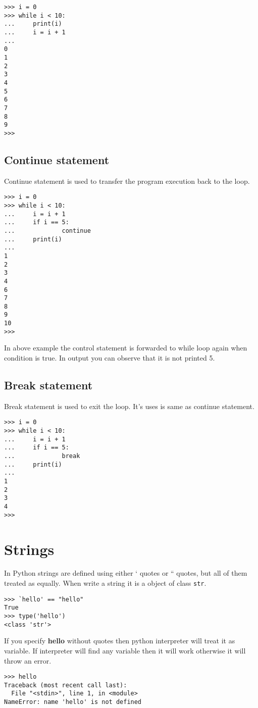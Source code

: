 \documentclass[letterpaper,12pt]{book}
\begin{document}
\begin{lstlisting}
>>> i = 0
>>> while i < 10:
...     print(i)
...     i = i + 1
... 
0
1
2
3
4
5
6
7
8
9
>>> 
\end{lstlisting}

\subsection{Continue statement}
Continue statement is used to transfer the program execution back to the loop.

\begin{lstlisting}
>>> i = 0
>>> while i < 10:
...     i = i + 1
...     if i == 5:
...             continue
...     print(i)
... 
1
2
3
4
6
7
8
9
10
>>> 
\end{lstlisting}
In above example the control statement is forwarded to while loop again when condition is true. In output you can observe that it is not printed 5.

\subsection{Break statement}
Break statement is used to exit the loop. It's uses is same as continue statement.
\begin{lstlisting}
>>> i = 0
>>> while i < 10:
...     i = i + 1
...     if i == 5:
...             break
...     print(i)
... 
1
2
3
4
>>> 
\end{lstlisting}

\section{Strings}
In Python strings are defined using either ` quotes or `` quotes, but all of them treated as equally. When write a string it is a object of class \texttt{str}. 
\begin{lstlisting}
>>> `hello' == "hello"
True
>>> type('hello')
<class 'str'>
\end{lstlisting}
If you specify \textbf{hello} without quotes then python interpreter will treat it as variable. If interpreter will find any variable then it will work otherwise it will throw an error.
\begin{lstlisting}
>>> hello
Traceback (most recent call last):
  File "<stdin>", line 1, in <module>
NameError: name 'hello' is not defined
\end{lstlisting}
\end{document}
